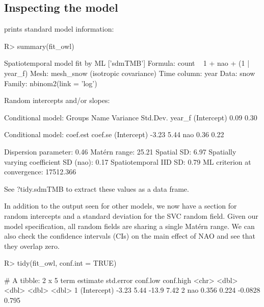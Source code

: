 \documentclass[article]{jss}\usepackage[]{graphicx}\usepackage[dvipsnames]{xcolor}
\newcommand{\fct}[1]{\code{#1()}}
\begin{document}
\subsection{Inspecting the model}

\fct{summary} prints standard model information:



\begin{Schunk}
\begin{Sinput}
R> summary(fit_owl)
\end{Sinput}
\begin{Soutput}
Spatiotemporal model fit by ML ['sdmTMB']
Formula: count ~ 1 + nao + (1 | year_f)
Mesh: mesh_snow (isotropic covariance)
Time column: year
Data: snow
Family: nbinom2(link = 'log')

Random intercepts and/or slopes:

Conditional model:
     Groups        Name    Variance    Std.Dev.
     year_f (Intercept)        0.09        0.30

Conditional model:
            coef.est coef.se
(Intercept)    -3.23    5.44
nao             0.36    0.22

Dispersion parameter: 0.46
Matérn range: 25.21
Spatial SD: 6.97
Spatially varying coefficient SD (nao): 0.17
Spatiotemporal IID SD: 0.79
ML criterion at convergence: 17512.366

See ?tidy.sdmTMB to extract these values as a data frame.
\end{Soutput}
\end{Schunk}

In addition to the output seen for other models, we now have a section for random intercepts and a standard deviation for the SVC random field.
Given our model specification, all random fields are sharing a single Matérn range.
We can also check the confidence intervals (CIs) on the main effect of NAO and see that they overlap zero.

\begin{Schunk}
\begin{Sinput}
R> tidy(fit_owl, conf.int = TRUE)
\end{Sinput}
\begin{Soutput}
# A tibble: 2 x 5
  term        estimate std.error conf.low conf.high
  <chr>          <dbl>     <dbl>    <dbl>     <dbl>
1 (Intercept)   -3.23      5.44  -13.9        7.42
2 nao            0.356     0.224  -0.0828     0.795
\end{Soutput}
\end{Schunk}
\end{document}
